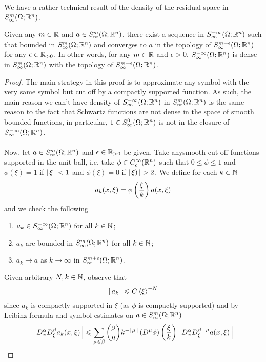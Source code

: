 \documentclass{article}
\begin{document}
We have a rather technical result of the density of the residual space in $S^{m}_\infty(\Omega; \R^n)$. 
\begin{flemma}
    Given any $m \in \R$ and $a \in S^{m}_\infty(\Omega; \R^n)$, there exist a sequence in $S^{-\infty}_\infty(\Omega; \R^n)$ such that bounded in $S^{m}_\infty(\Omega; \R^n)$ and converges to $a$ in the topology of $S^{m + \epsilon}_\infty(\Omega; \R^n)$ for any $\epsilon \in \R_{> 0}$. In other words, for any $m \in \R$ and $\epsilon > 0$, $S^{-\infty}_\infty(\Omega; \R^n)$ is dense in $S^{m}_\infty(\Omega; \R^n)$ with the topology of $S^{m + \epsilon}_\infty(\Omega; \R^n)$.
\end{flemma}
\begin{proof}
    The main strategy in this proof is to approximate any symbol with the very same symbol but cut off by a compactly supported function. As such, the main reason we can't have density of $S^{-\infty}_\infty(\Omega; \R^n)$ in $S^m_\infty(\Omega; \R^n)$ is the same reason to the fact that Schwartz functions are not dense in the space of smooth bounded functions, in particular, $1 \in S^0_\infty(\Omega; \R^n)$ is not in the closure of $S^{-\infty}_\infty(\Omega; \R^n)$. \\
    \\
    Now, let $a \in S^{m}_\infty(\Omega; \R^n)$ and $\epsilon \in \R_{>0}$ be given. Take anysmooth cut off functions supported in the unit ball, i.e. take $\phi \in C^\infty_c(\R^n)$ such that $0 \leq \phi \leq 1$ and $\phi(\xi) = 1 $ if $\abs{\xi} < 1$ and $\phi(\xi) = 0$ if $\abs{\xi)} > 2$. We define for each $k \in \N$
    \[
    a_k(x, \xi) = \phi\brac{\frac{\xi}{k}} a (x, \xi)
    \]
    and we check the following 
    \begin{enumerate}
        \item $a_k \in S^{-\infty}_\infty(\Omega; \R^n)$ for all $k \in \N$; 
        \item $a_k$ are bounded in $S^{m}_\infty(\Omega; \R^n)$ for all $k \in \N$; 
        \item $a_k \to a$ as $k \to \infty$ in $S^{m + \epsilon}_\infty(\Omega; \R^n)$. 
    \end{enumerate}
     Given arbitrary $N, k \in \N$, observe that 
     \[
     \abs{a_k} \leq C \sym[\xi]^{-N} 
     \]
     since $a_k$ is compactly supported in $\xi$ (as $\phi$ is compactly supported) and by Leibinz formula and symbol estimates on $a \in S^{m}_\infty(\Omega; \R^n)$
     \[
     \abs{D^\alpha_x D^\beta_\xi a_k(x, \xi)} 
     \leq \sum_{\mu \leq \beta} \binom{\beta}{\mu}k^{-\abs{\mu}} \brac{D^\mu \phi}\brac{\frac{\xi}{k}} \abs{D^\alpha_x D^{\beta - \mu}_\xi a(x, \xi) } 
\]
\end{proof}
\end{document}
